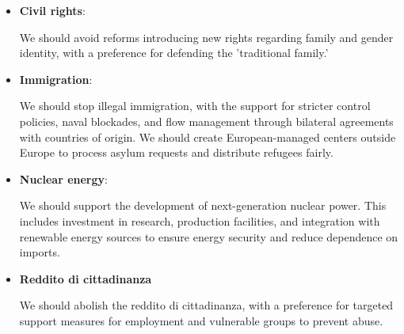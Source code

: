 \label{Right_opinions}

\begin{itemize}
    \item \textbf{Civil rights}:
        \begin{tcolorbox} We should avoid reforms introducing new rights regarding family and gender identity, with a preference for defending the 'traditional family.'
        \end{tcolorbox}

    \item \textbf{Immigration}:
        \begin{tcolorbox} We should stop illegal immigration, with the support for stricter control policies, naval blockades, and flow management through bilateral agreements with countries of origin. We should create European-managed centers outside Europe to process asylum requests and distribute refugees fairly.
        \end{tcolorbox}
        
    \item \textbf{Nuclear energy}: 
        \begin{tcolorbox} We should support the development of next-generation nuclear power. This includes investment in research, production facilities, and integration with renewable energy sources to ensure energy security and reduce dependence on imports.
        \end{tcolorbox}
    
    \item \textbf{Reddito di cittadinanza}
        \begin{tcolorbox} We should abolish the reddito di cittadinanza, with a preference for targeted support measures for employment and vulnerable groups to prevent abuse.
        \end{tcolorbox}
\end{itemize}